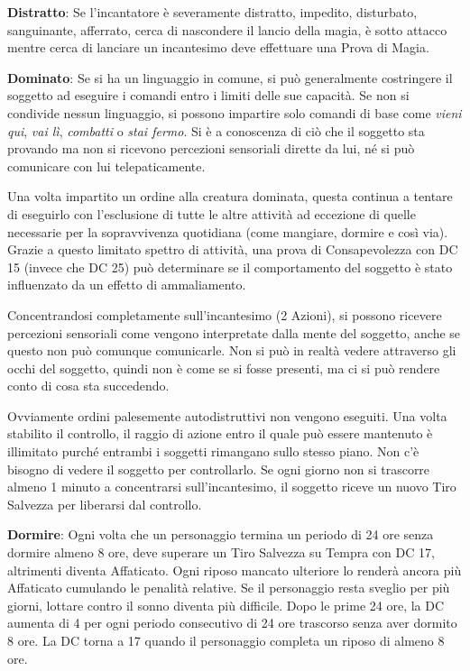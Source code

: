\begin{multicols}{2}
\textbf{Distratto}: Se l'incantatore è severamente distratto, impedito, disturbato, sanguinante, afferrato, cerca di nascondere il lancio della magia, è sotto attacco mentre cerca di lanciare un incantesimo deve effettuare una Prova di Magia.

\textbf{Dominato}: Se si ha un linguaggio in comune, si può generalmente costringere il soggetto ad eseguire i comandi entro i limiti delle sue capacità. Se non si condivide nessun linguaggio, si possono impartire solo comandi di base come \emph{vieni qui}, \emph{vai lì}, \emph{combatti} o \emph{stai fermo}. Si è a conoscenza di ciò che il soggetto sta provando ma non si ricevono percezioni sensoriali dirette da lui, né si può comunicare con lui telepaticamente.

Una volta impartito un ordine alla creatura dominata, questa continua a tentare di eseguirlo con l'esclusione di tutte le altre attività ad eccezione di quelle necessarie per la sopravvivenza quotidiana (come mangiare, dormire e così via). Grazie a questo limitato spettro di attività, una prova di Consapevolezza con DC 15 (invece che DC 25) può determinare se il comportamento del soggetto è stato influenzato da un effetto di ammaliamento.

Concentrandosi completamente sull'incantesimo (2 Azioni), si possono ricevere percezioni sensoriali come vengono interpretate dalla mente del soggetto, anche se questo non può comunque comunicarle. Non si può in realtà vedere attraverso gli occhi del soggetto, quindi non è come se si fosse presenti, ma ci si può rendere conto di cosa sta succedendo.

Ovviamente ordini palesemente autodistruttivi non vengono eseguiti. Una volta stabilito il controllo, il raggio di azione entro il quale può essere mantenuto è illimitato purché entrambi i soggetti rimangano sullo stesso piano. Non c'è bisogno di vedere il soggetto per controllarlo. Se ogni giorno non si trascorre almeno 1 minuto a concentrarsi sull'incantesimo, il soggetto riceve un nuovo Tiro Salvezza per liberarsi dal controllo.

\textbf{Dormire}: Ogni volta che un personaggio termina un periodo di 24 ore senza dormire almeno 8 ore, deve superare un Tiro Salvezza su Tempra con DC 17, altrimenti diventa Affaticato. Ogni riposo mancato ulteriore lo renderà ancora più Affaticato cumulando le penalità relative.
Se il personaggio resta sveglio per più giorni, lottare contro il sonno diventa più difficile. Dopo le prime 24 ore, la DC aumenta di 4 per ogni periodo consecutivo di 24 ore trascorso senza aver dormito 8 ore. La DC torna a 17 quando il personaggio completa un riposo di almeno 8 ore.


\end{multicols}
